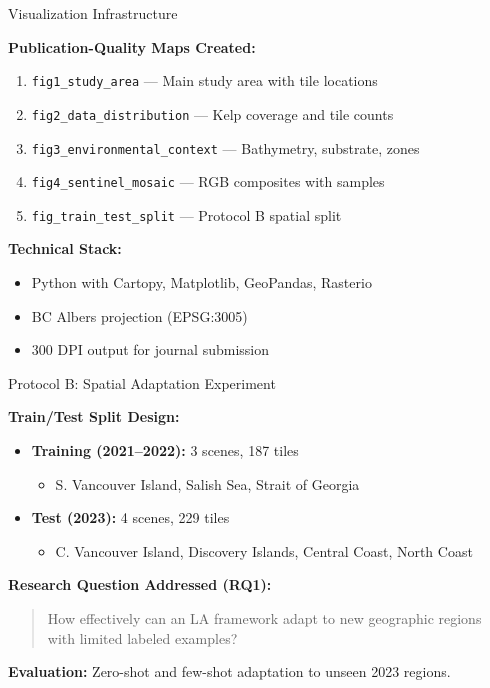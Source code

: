\documentclass[10pt,xcolor={table,dvipsnames},t]{beamer}
\begin{document}
\begin{frame}{Visualization Infrastructure}

\textbf{Publication-Quality Maps Created:}
\begin{enumerate}
  \item \texttt{fig1\_study\_area} --- Main study area with tile locations
  \item \texttt{fig2\_data\_distribution} --- Kelp coverage and tile counts
  \item \texttt{fig3\_environmental\_context} --- Bathymetry, substrate, zones
  \item \texttt{fig4\_sentinel\_mosaic} --- RGB composites with samples
  \item \texttt{fig\_train\_test\_split} --- Protocol B spatial split
\end{enumerate}

\vspace{0.5em}
\textbf{Technical Stack:}
\begin{itemize}
  \item Python with Cartopy, Matplotlib, GeoPandas, Rasterio
  \item BC Albers projection (EPSG:3005)
  \item 300 DPI output for journal submission
\end{itemize}

\end{frame}

\begin{frame}{Protocol B: Spatial Adaptation Experiment}

\textbf{Train/Test Split Design:}
\begin{itemize}
  \item \textbf{Training (2021--2022):} 3 scenes, 187 tiles
  \begin{itemize}
    \item S. Vancouver Island, Salish Sea, Strait of Georgia
  \end{itemize}
  \item \textbf{Test (2023):} 4 scenes, 229 tiles
  \begin{itemize}
    \item C. Vancouver Island, Discovery Islands, Central Coast, North Coast
  \end{itemize}
\end{itemize}

\vspace{0.5em}
\textbf{Research Question Addressed (RQ1):}
\begin{quote}
How effectively can an LA framework adapt to new geographic regions with limited labeled examples?
\end{quote}

\vspace{0.3em}
\textbf{Evaluation:} Zero-shot and few-shot adaptation to unseen 2023 regions.

\end{frame}
\end{document}
